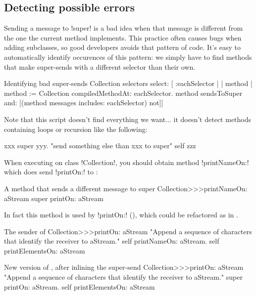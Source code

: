 \documentclass[a4paper,10pt,twoside]{book}
\begin{document}
\subsection{Detecting possible errors}

Sending a message to \ct!super! is a bad idea when that message is different from the one the current method implements.
This practice often causes bugs when adding subclasses, so good developers avoids that pattern of code.
It's easy to automatically identify occurences of this pattern: we simply have to find methods that make super-sends with a different selector than their own.

\begin{script}[findSuperSends]{Identifying bad super-sends}
Collection selectors select: [ :eachSelector |
	| method |
	method := Collection compiledMethodAt: eachSelector.
	method sendsToSuper and: [(method messages includes: eachSelector) not]]
\end{script}

Note that this script doesn't find everything we want... it doesn't detect methods containing loops or recursion like the following:
\begin{code}{}
xxx
	super yyy. "send something else than xxx to super"
	self zzz
\end{code}

When executing  on class \ct!Collection!, you should obtain method \ct!printNameOn:! which does send \ct!printOn:! to \super:
\begin{method}[printNameOn]{A method that sends a different message to super}
Collection>>>printNameOn: aStream
	super printOn: aStream
\end{method}

In fact this method is used by \ct!printOn:! (), which could be refactored as in .

\begin{method}[oldPrintOn]{The sender of }
Collection>>>printOn: aStream
	"Append a sequence of characters that identify the receiver to aStream."
	self printNameOn: aStream.
	self printElementsOn: aStream
\end{method}

\begin{method}[newPrintOn]{New version of , after inlining the  super-send}
Collection>>>printOn: aStream
	"Append a sequence of characters that identify the receiver to aStream."
	super printOn: aStream.
	self printElementsOn: aStream
\end{method}
\end{document}
